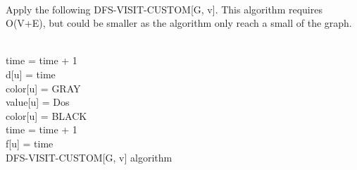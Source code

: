 \documentclass[11pt]{article}
\begin{document}
\begin{enumerate}
\begin{enumerate}
        \\ Apply the following DFS-VISIT-CUSTOM[G, v]. This algorithm requires O(V+E), but could be smaller as the algorithm only reach a small of the graph.
        \begin{algorithm}
        \Indm{}\\
        \Indp
            time = time + 1 \\
            d[u] = time \\
            color[u] = GRAY \\
            value[u] = Dos \\
            color[u] = BLACK \\
            time = time + 1 \\
            f[u] = time \\
            \caption{DFS-VISIT-CUSTOM[G, v] algorithm}
        \end{algorithm}
    \end{enumerate}
\end{enumerate}
\end{document}
